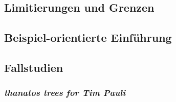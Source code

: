 \documentclass[12pt,a4paper,ngerman]{article}
\begin{document}
\subsection{Limitierungen und Grenzen}

%


%
%
%


%



\subsection{Beispiel-orientierte Einführung}

%
%



\subsection{Fallstudien}

\subsubsection{\emph{thanatos trees for Tim Pauli}}
\end{document}
